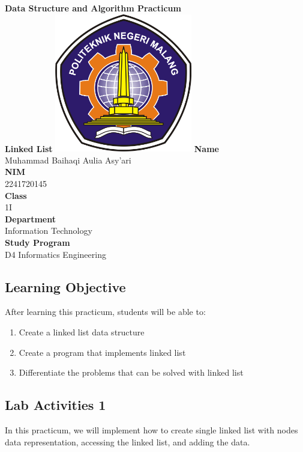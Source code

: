 \documentclass[12pt,titlepage]{article}
\newcommand{\vSubject}{Data Structure and Algorithm Practicum}
\newcommand{\vSubtitle}{Linked List}
\newcommand{\vName}{Muhammad Baihaqi Aulia Asy'ari}
\newcommand{\vNIM}{2241720145}
\newcommand{\vClass}{1I}
\newcommand{\vDepartment}{Information Technology}
\newcommand{\vStudyProgram}{D4 Informatics Engineering}
\begin{document}
\begin{titlepage}
    \centering
    \vfill
    {\bfseries\LARGE
        \vSubject\\
        \vskip0.25cm
        \vSubtitle
    }
    \vfill
    \includegraphics[width=6cm]{images/polinema-logo.png}
    \vfill
    {
        \textbf{Name}\\
        \vName\\
        \vskip0.5cm
        \textbf{NIM}\\
        \vNIM\\
        \vskip0.5cm
        \textbf{Class}\\
        \vClass\\
        \vskip0.5cm
        \textbf{Department}\\
        \vDepartment\\
        \vskip0.5cm
        \textbf{Study Program}\\
        \vStudyProgram
    }
\end{titlepage}

\newpage

\setcounter{section}{1}
\subsection{Learning Objective}

After learning this practicum, students will be able to:
\begin{enumerate}
    \item Create a linked list data structure
    \item Create a program that implements linked list
    \item Differentiate the problems that can be solved with linked list
\end{enumerate}

\subsection{Lab Activities 1}
In this practicum, we will implement how to create single linked list with nodes data representation, accessing the linked list, and adding the data.
\end{document}
